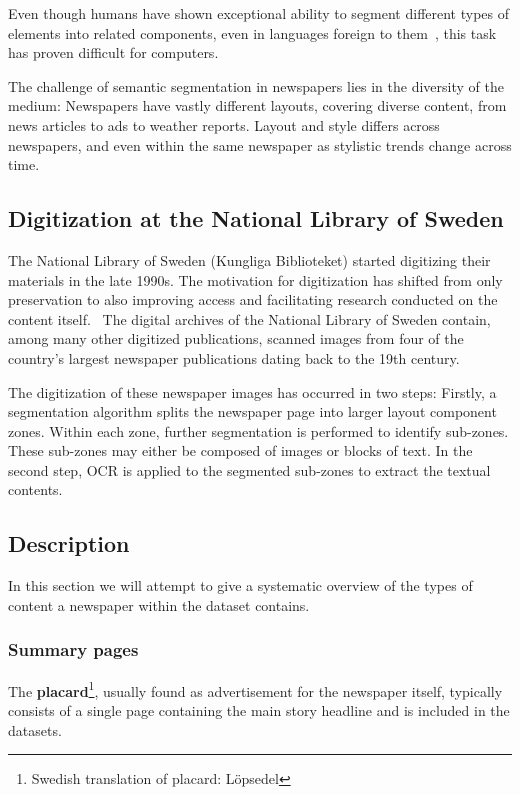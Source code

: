 \documentclass[oneside, english, bibtex]{kththesis}
\begin{document}
Even though humans have shown exceptional ability to segment different types of elements into related components, even in languages foreign to them~\cite{8270006}, this task has proven difficult for computers.

The challenge of semantic segmentation in newspapers lies in the diversity of the medium: Newspapers have vastly different layouts, covering diverse content, from news articles to ads to weather reports. Layout and style differs across newspapers, and even within the same newspaper as stylistic trends change across time.


\subsection{Digitization at the National Library of Sweden}

The National Library of Sweden (Kungliga Biblioteket) started digitizing their materials in the late 1990s. The motivation for digitization has shifted from only preservation to also improving access and facilitating research conducted on the content itself.~\cite{Rekathati_2020} The digital archives of the National Library of Sweden contain, among many other digitized publications, scanned images from four of the country’s largest newspaper publications dating back to the 19th century.

The digitization of these newspaper images has occurred in two steps: Firstly, a segmentation algorithm splits the newspaper page into larger layout component zones. Within each zone, further segmentation is performed to identify sub-zones. These sub-zones may either be composed of images or blocks of text. In the second step, OCR is applied to the segmented sub-zones to extract the textual contents.

\subsection{Description}

In this section we will attempt to give a systematic overview of the types of content a newspaper within the dataset contains.

\subsubsection{Summary pages}

The \textbf{placard}\footnote{Swedish translation of placard: Löpsedel}, usually found as advertisement for the newspaper itself, typically consists of a single page containing the main story headline and is included in the datasets.
\end{document}
